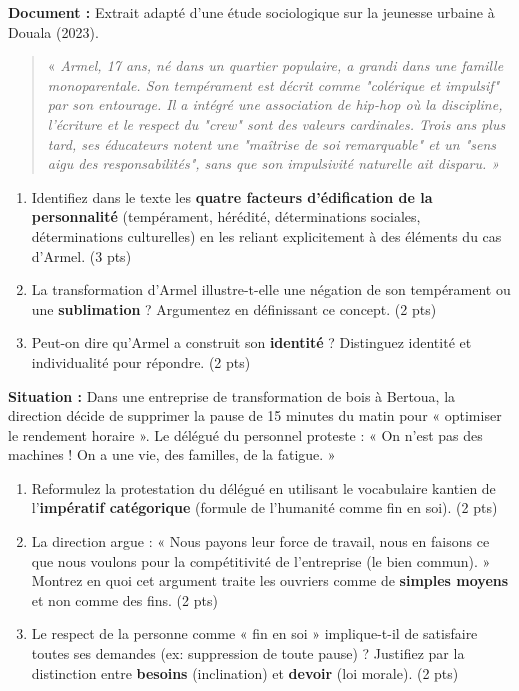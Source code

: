 \documentclass[11pt]{article}
\begin{document}
\begin{exercice}
\textbf{Document :} Extrait adapté d'une étude sociologique sur la jeunesse urbaine à Douala (2023).
\begin{quote}
« \textit{Armel, 17 ans, né dans un quartier populaire, a grandi dans une famille monoparentale. Son tempérament est décrit comme "colérique et impulsif" par son entourage. Il a intégré une association de hip-hop où la discipline, l'écriture et le respect du "crew" sont des valeurs cardinales. Trois ans plus tard, ses éducateurs notent une "maîtrise de soi remarquable" et un "sens aigu des responsabilités", sans que son impulsivité naturelle ait disparu. »}
\end{quote}
\begin{enumerate}
    \item Identifiez dans le texte les \textbf{quatre facteurs d'édification de la personnalité} (tempérament, hérédité, déterminations sociales, déterminations culturelles) en les reliant explicitement à des éléments du cas d'Armel. (3 pts)
    \item La transformation d'Armel illustre-t-elle une négation de son tempérament ou une \textbf{sublimation} ? Argumentez en définissant ce concept. (2 pts)
    \item Peut-on dire qu'Armel a construit son \textbf{identité} ? Distinguez identité et individualité pour répondre. (2 pts)
\end{enumerate}
\end{exercice}

\begin{exercice}
\textbf{Situation :} Dans une entreprise de transformation de bois à Bertoua, la direction décide de supprimer la pause de 15 minutes du matin pour « optimiser le rendement horaire ». Le délégué du personnel proteste : « On n'est pas des machines ! On a une vie, des familles, de la fatigue. »
\begin{enumerate}
    \item Reformulez la protestation du délégué en utilisant le vocabulaire kantien de l'\textbf{impératif catégorique} (formule de l'humanité comme fin en soi). (2 pts)
    \item La direction argue : « Nous payons leur force de travail, nous en faisons ce que nous voulons pour la compétitivité de l'entreprise (le bien commun). » Montrez en quoi cet argument traite les ouvriers comme de \textbf{simples moyens} et non comme des fins. (2 pts)
    \item Le respect de la personne comme « fin en soi » implique-t-il de satisfaire toutes ses demandes (ex: suppression de toute pause) ? Justifiez par la distinction entre \textbf{besoins} (inclination) et \textbf{devoir} (loi morale). (2 pts)
\end{enumerate}
\end{exercice}
\end{document}
